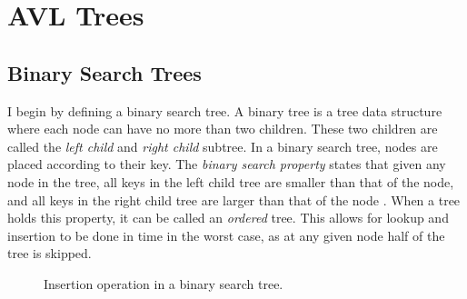 \section{AVL Trees}

\subsection{Binary Search Trees} 
\label{sec:bst}
I begin by defining a binary search tree. A binary tree is a tree data structure where each node can have no more than two children. These two children are 
called the \textit{left child} and \textit{right child} subtree. In a binary search tree, nodes are placed according to their key. The 
\textit{binary search property} states that given any node in the tree, all keys in the left child tree are smaller than that of the node, and all keys in the 
right child tree are larger than that of the node . When a tree holds this property, it can be called an \textit{ordered} tree. 
This allows for lookup and insertion to be done in  time in the worst case, as at any given node half of the tree is skipped.

\begin{figure}[!h]
  \centering
  \begin{subfigure}{.3\textwidth}
    \centering
    \caption{}
    \label{fig:insert_1}
  \end{subfigure}%
  \begin{subfigure}{.3\textwidth}
    \centering
    \caption{}
    \label{fig:insert_2}
  \end{subfigure}%
  \begin{subfigure}{.3\textwidth}
    \centering
    \caption{}
    \label{fig:insert_3}
  \end{subfigure}
  \caption{Insertion operation in a binary search tree.}
  \label{fig:insert_demo}
\end{figure}

